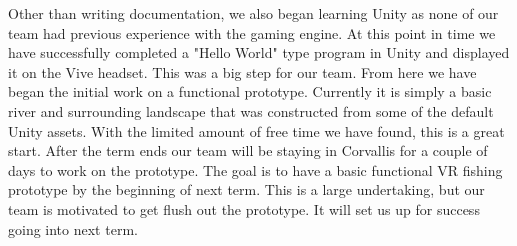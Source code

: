\documentclass[10pt,journal,compsoc,onecolumn, draftclsnofoot]{IEEEtran}
\begin{document}
Other than writing documentation, we also began learning Unity as none of our team had previous experience with the gaming engine.
At this point in time we have successfully completed a "Hello World" type program in Unity and displayed it on the Vive headset.
This was a big step for our team.
From here we have began the initial work on a functional prototype.
Currently it is simply a basic river and surrounding landscape that was constructed from some of the default Unity assets.
With the limited amount of free time we have found, this is a great start.
After the term ends our team will be staying in Corvallis for a couple of days to work on the prototype.
The goal is to have a basic functional VR fishing prototype by the beginning of next term.
This is a large undertaking, but our team is motivated to get flush out the prototype.
It will set us up for success going into next term.

%
%
\end{document}
